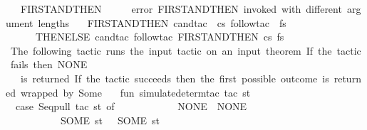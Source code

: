 \begin{isabellebody}
\ \ {\isacharbar}{\kern0pt}\ FIRST{\isacharunderscore}{\kern0pt}AND{\isacharunderscore}{\kern0pt}THEN{\isacharprime}{\kern0pt}\ {\isacharbrackleft}{\kern0pt}{\isacharbrackright}{\kern0pt}\ {\isacharparenleft}{\kern0pt}{\isacharunderscore}{\kern0pt}\ {\isacharcolon}{\kern0pt}{\isacharcolon}{\kern0pt}\ {\isacharunderscore}{\kern0pt}{\isacharparenright}{\kern0pt}\ {\isacharequal}{\kern0pt}\ error\ {\isachardoublequote}{\kern0pt}FIRST{\isacharunderscore}{\kern0pt}AND{\isacharunderscore}{\kern0pt}THEN{\isacharprime}{\kern0pt}\ invoked\ with\ different\ argument\ lengths{\isachardoublequote}{\kern0pt}\isanewline
\ \ {\isacharbar}{\kern0pt}\ FIRST{\isacharunderscore}{\kern0pt}AND{\isacharunderscore}{\kern0pt}THEN{\isacharprime}{\kern0pt}\ {\isacharparenleft}{\kern0pt}cand{\isacharunderscore}{\kern0pt}tac\ {\isacharcolon}{\kern0pt}{\isacharcolon}{\kern0pt}\ cs{\isacharparenright}{\kern0pt}\ {\isacharparenleft}{\kern0pt}follow{\isacharunderscore}{\kern0pt}tac\ {\isacharcolon}{\kern0pt}{\isacharcolon}{\kern0pt}\ fs{\isacharparenright}{\kern0pt}\ {\isacharequal}{\kern0pt}\isanewline
\ \ \ \ \ \ THEN{\isacharunderscore}{\kern0pt}ELSE{\isacharprime}{\kern0pt}\ cand{\isacharunderscore}{\kern0pt}tac\ {\isacharparenleft}{\kern0pt}follow{\isacharunderscore}{\kern0pt}tac{\isacharcomma}{\kern0pt}\ FIRST{\isacharunderscore}{\kern0pt}AND{\isacharunderscore}{\kern0pt}THEN{\isacharprime}{\kern0pt}\ cs\ fs{\isacharparenright}{\kern0pt}\isanewline
\isanewline
{\isacharparenleft}{\kern0pt}{\isacharasterisk}{\kern0pt}\ The\ following\ tactic\ runs\ the\ input\ tactic\ on\ an\ input\ theorem{\isachardot}{\kern0pt}\ If\ the\ tactic\ fails{\isacharcomma}{\kern0pt}\ then\ NONE\isanewline
\ \ \ is\ returned{\isachardot}{\kern0pt}\ If\ the\ tactic\ succeeds{\isacharcomma}{\kern0pt}\ then\ the\ first\ possible\ outcome\ is\ returned\ {\isacharparenleft}{\kern0pt}wrapped\ by\ Some{\isacharparenright}{\kern0pt}{\isachardot}{\kern0pt}{\isacharasterisk}{\kern0pt}{\isacharparenright}{\kern0pt}\ \ \ \isanewline
fun\ simulate{\isacharunderscore}{\kern0pt}determ{\isacharunderscore}{\kern0pt}tac\ tac\ st\ {\isacharequal}{\kern0pt}\isanewline
\ \ {\isacharparenleft}{\kern0pt}case\ Seq{\isachardot}{\kern0pt}pull\ {\isacharparenleft}{\kern0pt}tac\ st{\isacharparenright}{\kern0pt}\ of\isanewline
\ \ \ \ \ \ \ \ \ \ \ \ NONE\ {\isacharequal}{\kern0pt}{\isachargreater}{\kern0pt}\ NONE\isanewline
\ \ \ \ \ \ \ \ \ \ {\isacharbar}{\kern0pt}\ SOME\ {\isacharparenleft}{\kern0pt}st{\isacharprime}{\kern0pt}{\isacharcomma}{\kern0pt}\ {\isacharunderscore}{\kern0pt}{\isacharparenright}{\kern0pt}\ {\isacharequal}{\kern0pt}{\isachargreater}{\kern0pt}\ SOME\ st{\isacharprime}{\kern0pt}{\isacharparenright}{\kern0pt}\isanewline

\end{isabellebody}
